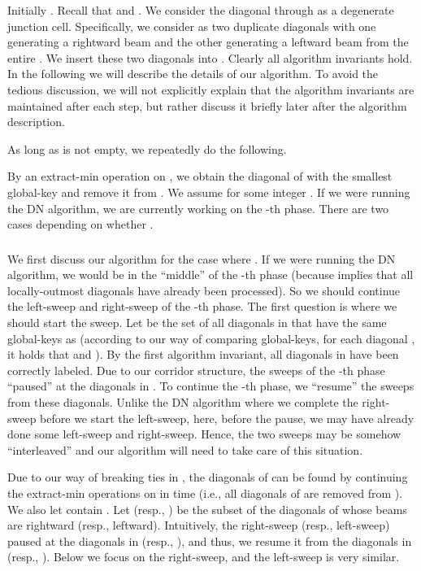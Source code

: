 \documentclass[english,runningheads,11pt]{llncs-revised}
\begin{document}
Initially . Recall that  and .
We consider the diagonal  through  as a degenerate junction cell. Specifically, we consider  as two duplicate diagonals with one generating a rightward beam and the other generating a leftward beam from the entire . We insert these two diagonals into .
Clearly all algorithm invariants hold.
In the following we will describe the details of our algorithm. To
avoid the tedious discussion, we
will not explicitly explain that the algorithm invariants are
maintained after each step, but rather discuss it briefly later after the algorithm
description.

As long as  is not empty, we repeatedly do the following.

By an extract-min operation on , we obtain the diagonal  of  with
the smallest global-key and remove it from . We assume  for some integer .
If we were running the DN algorithm, we are currently working on the
-th phase. There are two cases depending on
whether .

\subsubsection{}




We first discuss our algorithm for the case where . If we were running the DN algorithm, we would be in the ``middle''
of the -th phase (because  implies that all locally-outmost diagonals
have already been processed). So we
should continue the left-sweep and right-sweep of the -th phase.
The first question is where we should start the sweep.
Let  be the set of all diagonals in  that have the same global-keys as  (according to our way of comparing global-keys, for each diagonal , it holds that
 and ).
By the first algorithm invariant, all diagonals in  have been correctly
labeled. Due to our corridor structure, the sweeps of the -th phase
``paused'' at the diagonals in . To continue the -th phase, we
``resume'' the sweeps from these diagonals. Unlike the DN algorithm
where we complete the right-sweep before we start the left-sweep,
here, before the pause, we may have already done some left-sweep and
right-sweep. Hence, the two sweeps may be somehow ``interleaved'' and
our algorithm will need to take care of this situation.

Due to our way of breaking ties in , the diagonals of  can be found by
continuing the extract-min operations on  in  time (i.e., all diagonals of  are removed from ). We also let  contain .
Let  (resp., ) be the subset of the diagonals of  whose beams are rightward (resp., leftward).
Intuitively, the right-sweep (resp., left-sweep) paused at the diagonals in  (resp., ), and thus,
we resume it from the diagonals in  (resp.,
). Below we focus on the right-sweep, and the left-sweep is very similar.
\end{document}
